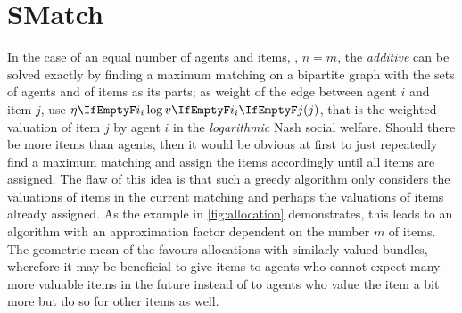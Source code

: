 \section{SMatch}
\label{sec:smatch}

In the case of an equal number of agents and items, \ie, \(n = m\), the \emph{additive} \NSW{} can be solved exactly by finding a maximum matching on a bipartite graph with the sets of agents and of items as its parts;
as weight of the edge between agent \(i\) and item \(j\), use \(\weight \log \valuations[j]\), that is the weighted valuation of item \(j\) by agent \(i\) in the \emph{logarithmic} Nash social welfare.
Should there be more items than agents, then it would be obvious at first to just repeatedly find a maximum matching and assign the items accordingly until all items are assigned.
The flaw of this idea is that such a greedy algorithm only considers the valuations of items in the current matching and perhaps the valuations of items already assigned.
As the example in \cref{fig:allocation} demonstrates, this leads to an algorithm with an approximation factor dependent on the number \(m\) of items.
The geometric mean of the \NSW{} favours allocations with similarly valued bundles, wherefore it may be beneficial to give items to agents who cannot expect many more valuable items in the future instead of to agents who value the item a bit more but do so for other items as well.

